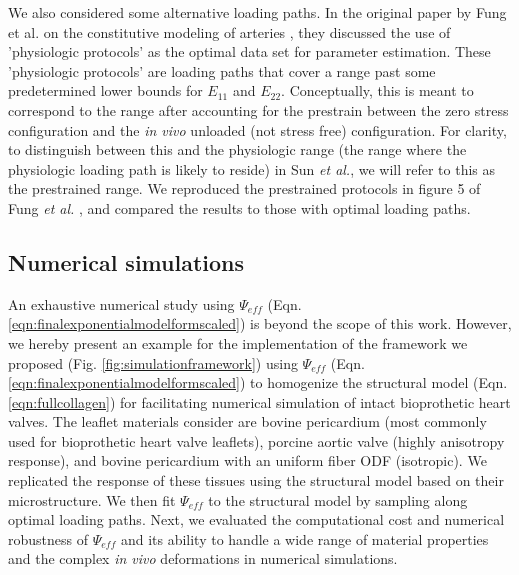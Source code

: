     We also considered some alternative loading paths. In the original paper by Fung et al. on the constitutive modeling of arteries \cite{fung_pseudoelasticity_1979}, they discussed the use of 'physiologic protocols' as the optimal data set for parameter estimation. These 'physiologic protocols' are loading paths that cover a range past some predetermined lower bounds for $E_{11}$ and $E_{22}$. Conceptually, this is meant to correspond to the range after accounting for the prestrain between the zero stress configuration and the \textit{in vivo} unloaded (not stress free) configuration. For clarity, to distinguish between this and the physiologic range (the range where the physiologic loading path is likely to reside) in Sun \textit{et al.}, we will refer to this as the prestrained range. We reproduced the prestrained protocols in figure 5 of Fung \textit{et al.} \cite{fung_pseudoelasticity_1979}, and compared the results to those with optimal loading paths. 





\subsection{Numerical simulations}

	An exhaustive numerical study using $\Psi_{eff}$ (Eqn. \ref{eqn:finalexponentialmodelformscaled}) is beyond the scope of this work. However, we hereby present an example for the implementation of the framework we proposed (Fig. \ref{fig:simulationframework}) using $\Psi_{eff}$ (Eqn. \ref{eqn:finalexponentialmodelformscaled}) to homogenize the structural model (Eqn. \ref{eqn:fullcollagen}) for facilitating numerical simulation of intact bioprothetic heart valves. The leaflet materials consider are bovine pericardium (most commonly used for bioprothetic heart valve leaflets), porcine aortic valve (highly anisotropy response), and bovine pericardium with an uniform fiber ODF (isotropic). We replicated the response of these tissues using the structural model based on their microstructure. We then fit $\Psi_{eff}$ to the structural model by sampling along optimal loading paths. Next, we evaluated the computational cost and numerical robustness of $\Psi_{eff}$ and its ability to handle a wide range of material properties and the complex \textit{in vivo} deformations in numerical simulations.
    
